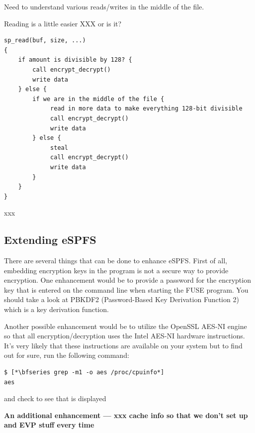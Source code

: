 \noindent
Need to understand various reads/writes in the middle of the file.

Reading is a little easier XXX or is it?

\begin{lstlisting}
sp_read(buf, size, ...)
{
    if amount is divisible by 128? {
        call encrypt_decrypt()
        write data
    } else {
        if we are in the middle of the file {
             read in more data to make everything 128-bit divisible
             call encrypt_decrypt()
             write data
        } else {
             steal
             call encrypt_decrypt()
             write data
        }
    }  
}
\end{lstlisting}

\noindent
xxx


\subsection{Extending eSPFS}

There are several things that can be done to enhance eSPFS. First of all, embedding encryption keys in the program is not a secure way to provide encryption. One enhancement would be to provide a password for the encryption key that is entered on the command line when starting the FUSE program. You should take a look at PBKDF2 (Password-Based Key Derivation Function 2) which is a key derivation function.

Another possible enhancement would be to utilize the OpenSSL AES-NI engine so that all encryption/decryption uses the Intel AES-NI hardware instructions. It's very likely that these instructions are available on your system but to find out for sure, run the following command:

\begin{lstlisting}
$ [*\bfseries grep -m1 -o aes /proc/cpuinfo*]
aes
\end{lstlisting}

\noindent
and check to see that  is displayed


\textbf{An additional enhancement --- xxx cache info so that we don't set up and EVP stuff every time}

